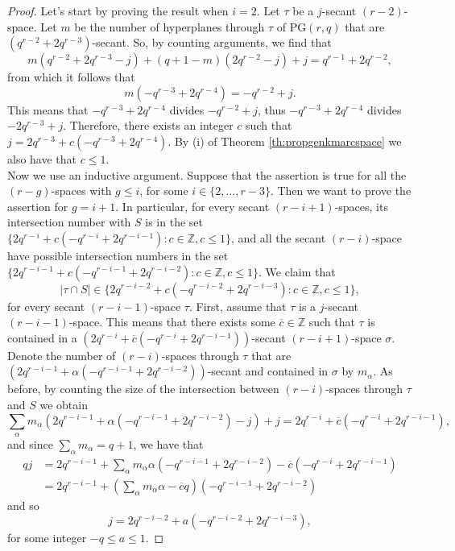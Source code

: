 \documentclass[10pt,a4paper]{amsart}
\newcommand{\PG}{\mathrm{PG}}
\begin{document}
\begin{proof}
Let's start by proving the result when $i=2$. Let $\tau$ be a $j$-secant $(r-2)$-space. Let $m$ be the number of hyperplanes through $\tau$ of $\PG(r,q)$ that are $(q^{r-2}+2q^{r-3})$-secant. So, by counting arguments, we find that
\[
m(q^{r-2}+2q^{r-3}-j)+(q+1-m)(2q^{r-2}-j)+j=q^{r-1}+2q^{r-2},
\]
from which it follows that
\[
m(-q^{r-3}+2q^{r-4})=-q^{r-2}+j.
\]
This means that $-q^{r-3}+2q^{r-4}$ divides $-q^{r-2}+j$, thus $-q^{r-3}+2q^{r-4}$ divides $-2q^{r-3}+j$. Therefore, there exists an integer $c$ such that $j=2q^{r-3}+c(-q^{r-3}+2q^{r-4})$. By (i) of Theorem \ref{th:propgenkmarcspace} we also have 
that $c \leq 1$.\\
Now we use an inductive argument.
Suppose that the assertion is true for all the $(r-g)$-spaces with $g\leq i$, for some $i \in \{2,\ldots,r-3\}$. 
Then we want to prove the assertion for $g=i+1$.
In particular, for every secant $(r-i+1)$-spaces, its intersection number with $S$ is in the set
 $\{2q^{r-i}+c(-q^{r-i}+2q^{r-i-1}) \colon c \in \mathbb{Z}, c \leq 1\}$, and all the secant $(r-i)$-space have possible intersection numbers in the set $\{2q^{r-i-1}+c(-q^{r-i-1}+2q^{r-i-2}) \colon c \in \mathbb{Z}, c \leq 1\} $.
We claim that 
\[
 |\tau \cap S| \in \{2q^{r-i-2}+c(-q^{r-i-2}+2q^{r-i-3}) \colon c \in \mathbb{Z}, c \leq 1\}, 
\]
for every secant $(r-i-1)$-space $\tau$. First, assume that $\tau$ is a $j$-secant $(r-i-1)$-space. This means that there exists some $\overline{c} \in \mathbb{Z}$ such that $\tau$ is contained in a $(2q^{r-i}+\overline{c}(-q^{r-i}+2q^{r-i-1}))$-secant $(r-i+1)$-space $\sigma$. 
Denote the number of $(r-i)$-spaces through $\tau$ that are $(2q^{r-i-1}+\alpha(-q^{r-i-1}+2q^{r-i-2}))$-secant and contained in $\sigma$ by $m_\alpha$. As before, by counting the size of the intersection between $(r-i)$-spaces through $\tau$ and $S$ we obtain
 \[
 \sum_{\alpha} m_{\alpha} (2q^{r-i-1}+{\alpha}(-q^{r-i-1}+2q^{r-i-2})-j)+j=2q^{r-i}+\overline{c}(-q^{r-i}+2q^{r-i-1}), 
 \]
and since $\sum_{\alpha} m_{\alpha}=q+1$, we have that
\[
\begin{array}{rl}
qj & = 2q^{r-i-1}+\sum_{\alpha} m_{\alpha} {\alpha}(-q^{r-i-1}+2q^{r-i-2})-\overline{c}(-q^{r-i}+2q^{r-i-1}) \\
& = 2q^{r-i-1}+(\sum_{\alpha} m_{\alpha} {\alpha}-\overline{c}q)(-q^{r-i-1}+2q^{r-i-2})
\end{array}\] 
and so
\[
j=2q^{r-i-2}+a(-q^{r-i-2}+2q^{r-i-3}),
\]
for some integer $-q\leq a \leq 1$. 
\end{proof}
\end{document}
